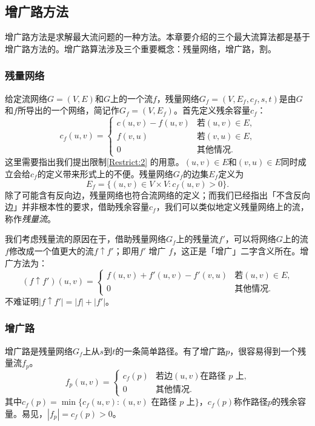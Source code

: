 \documentclass[fontset=ubuntu]{ctexbook}
\begin{document}
    \subsection{增广路方法}
    增广路方法是求解最大流问题的一种方法。本章要介绍的三个最大流算法都是基于增广路方法的。增广路算法涉及三个重要概念：残量网络，增广路，割。
    \subsubsection*{残量网络}
    给定流网络$G=(V,E)$和$G$上的一个流$f$，残量网络$G_f=(V,E_f,c_f, s, t)$是由$G$和$f$所导出的一个网络，简记作$G_f=(V,E_f)$。首先定义残余容量$c_f$：
    \[
    c_f(u,v) =
    \begin{cases}
        c(u,v) - f(u,v) & \text{若$(u,v)\in E$,}\\
        f(v,u) & \text{若$(v,u)\in E$,} \\
        0 & \text{其他情况.}
    \end{cases}
    \]
    这里需要指出我们提出限制\ref{Restrict:2} 的用意。$(u,v)\in E$和$(v,u)\in E$同时成立会给$c_f$的定义带来形式上的不便。残量网络$G_f$的边集$E_f$定义为
    \[
    E_f = \{(u,v)\in V\times V\colon c_f(u,v)>0\}.
    \]
    除了可能含有反向边，残量网络也符合流网络的定义；而我们已经指出「不含反向边」并非根本性的要求，借助残余容量$c_f$，我们可以类似地定义残量网络上的流，称作\emph{残量流}。

    我们考虑残量流的原因在于，借助残量网络$G_f$上的残量流$f'$，可以将网络$G$上的流$f$修改成一个值更大的流$f\uparrow f'$；即用$f'$ 增广 $f$，这正是「增广」二字含义所在。增广方法为：
    \[
    (f\uparrow f')(u,v) =\begin{cases}
    f(u,v) + f'(u,v) - f'(v,u) & \text{若$(u,v)\in E$,} \\
    0 & \text{其他情况.}
\end{cases}
    \]
    不难证明$|f\uparrow f'| = |f| + |f'|$。
    \subsubsection{增广路}
    增广路是残量网络$G_f$上从$s$到$t$的一条简单路径。有了增广路$p$，很容易得到一个残量流$f_p$。
    \[
    f_p(u,v) =\begin{cases}
    c_f(p) & \text{若边$(u,v)$在路径 $p$ 上,}\\
    0 & \text{其他情况.}
\end{cases}
    \]
    其中$c_f(p) = \min\{c_f(u,v)\colon (u,v)\text{ 在路径 }p\text{ 上} \}$，$c_f(p)$称作路径$p$的残余容量。易见，$|f_p| = c_f(p) > 0$。
\end{document}
